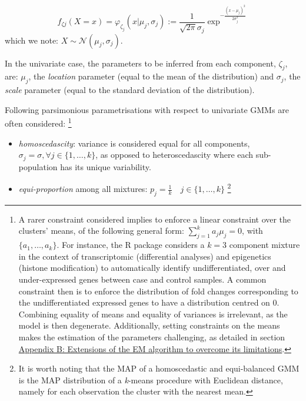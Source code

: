 \begin{equation}
f_{\zeta j}(X=x)=\varphi_{\zeta_j}(x | \mu_j, \sigma_j):=\frac{1}{\sqrt{2\pi} \sigma_j} \exp^{- \frac{(x - \mu_j)^2}{2 \sigma_j^2}}
\label{eq:gaussian-dist}
\end{equation} which we note: \(X \sim \mathcal{N}(\mu_j, \sigma_j)\).

In the univariate case, the parameters to be inferred from each
component, \(\zeta_j\), are: \(\mu_j\), the \emph{location} parameter (equal to
the mean of the distribution) and \(\sigma_j\), the \emph{scale} parameter
(equal to the standard deviation of the distribution).

Following parsimonious parametrisations with respect to univariate GMMs
are often considered: \footnote{A rarer constraint considered implies to enforce a linear
  constraint over the clusters' means, of the following general form:
  \(\sum_{j=1}^k a_j \mu_j=0\), with \(\{a_1, \ldots, a_k\}\). For
  instance, the R package  considers a \(k=3\) component
  mixture in the context of transcriptomic (differential analyses) and
  epigenetics (histone modification) to automatically identify
  undifferentiated, over and under-expressed genes between case and
  control samples. A common constraint then is to enforce the
  distribution of fold changes corresponding to the undifferentiated
  expressed genes to have a distribution centred on 0. Combining
  equality of means and equality of variances is irrelevant, as the
  model is then degenerate. Additionally, setting constraints on the
  means makes the estimation of the parameters challenging, as
  detailed in section \protect\hyperlink{appendix-b-extensions-of-the-em-algorithm-to-overcome-its-limitations}{Appendix B: Extensions of the EM algorithm to overcome its limitations}.}

\begin{itemize}
\item
  \emph{homoscedascity}: variance is considered equal for all components,
  \(\sigma_j = \sigma, \forall j \in \{1, \ldots, k \}\), as opposed to
  heteroscedascity where each sub-population has its unique
  variability.
\item
  \emph{equi-proportion} among all mixtures:
  \(p_j = \frac{1}{k} \quad j \in \{ 1, \ldots, k\}\) \footnote{It is worth noting that the MAP of a homoscedastic and
    equi-balanced GMM is the MAP distribution of a \emph{k}-means procedure
    with Euclidean distance, namely for each observation the cluster
    with the nearest mean.}
\end{itemize}

